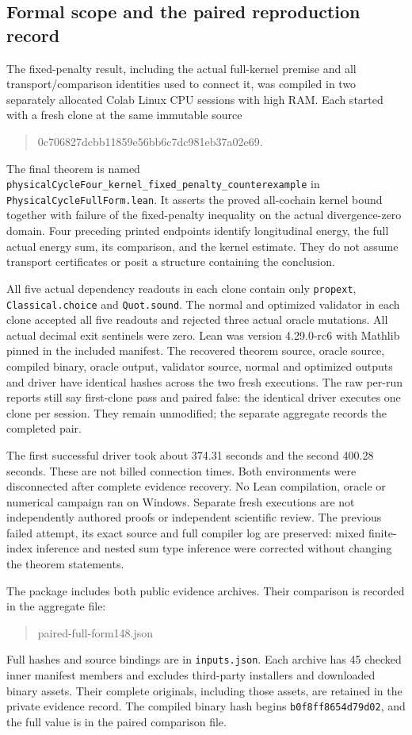 \subsection{Formal scope and the paired reproduction record}
The fixed-penalty result, including the actual full-kernel premise and
all transport/comparison identities used to connect it, was compiled in
two separately allocated Colab Linux CPU sessions with high RAM. Each
started with a fresh clone at the same immutable source
\begin{quote}\small\ttfamily
0c706827dcbb11859e56bb6c7dc981eb37a02e69.
\end{quote}
The final theorem is named
\texttt{physicalCycleFour\_kernel\_fixed\_penalty\_counterexample}
in \texttt{PhysicalCycleFullForm.lean}. It asserts the proved
all-cochain kernel bound together with failure of the fixed-penalty
inequality on the actual divergence-zero domain. Four preceding printed
endpoints identify longitudinal energy, the full actual energy sum,
its comparison, and the kernel estimate. They do not assume transport
certificates or posit a structure containing the conclusion.

All five actual dependency readouts in each clone contain only
\texttt{propext}, \texttt{Classical.choice} and \texttt{Quot.sound}.
The normal and optimized validator in each clone accepted all five
readouts and rejected three actual oracle mutations. All actual decimal
exit sentinels were zero. Lean was version 4.29.0-rc6 with Mathlib pinned
in the included manifest. The recovered theorem source, oracle source,
compiled binary, oracle output, validator source, normal and optimized
outputs and driver have identical hashes across the two fresh executions.
The raw per-run reports still say first-clone pass and paired false:
the identical driver executes one clone per session. They remain
unmodified; the separate aggregate records the completed pair.

The first successful driver took about 374.31 seconds and the second
400.28 seconds. These are not billed connection times. Both environments
were disconnected after complete evidence recovery. No Lean compilation,
oracle or numerical campaign ran on Windows. Separate fresh executions
are not independently authored proofs or independent scientific review.
The previous failed attempt, its exact source and full compiler log are
preserved: mixed finite-index inference and nested sum type inference
were corrected without changing the theorem statements.

The package includes both public evidence archives. Their comparison is
recorded in the aggregate file:
\begin{quote}\small\ttfamily
paired-full-form148.json
\end{quote}
Full hashes and source bindings are in \texttt{inputs.json}.
Each archive has 45 checked inner manifest
members and excludes third-party installers and downloaded binary assets.
Their complete originals, including those assets, are retained in the
private evidence record. The compiled binary hash begins
\texttt{b0f8ff8654d79d02}, and the full value is in the paired comparison file.

